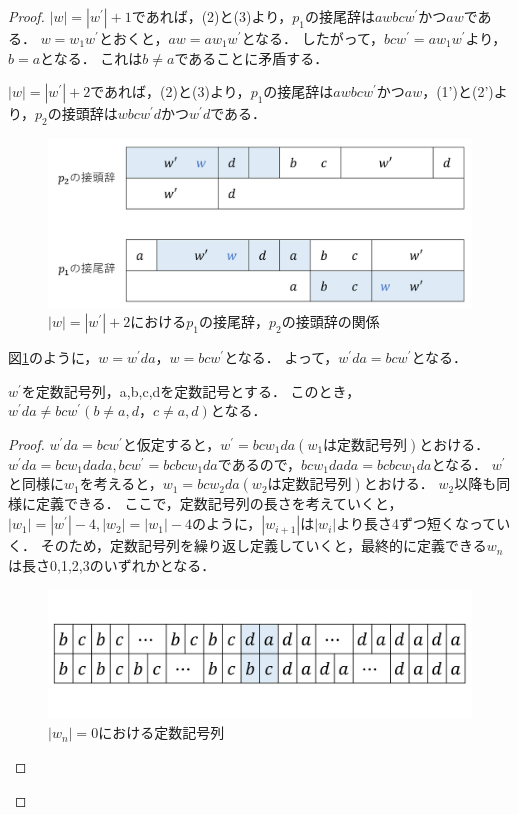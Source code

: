 \begin{proof}
$|w| = |w^{\prime}|+1$であれば，(2)と(3)より，$p_{1}$の接尾辞は$awbcw^{\prime}$かつ$aw$である．
$w=w_{1}w^{\prime}$とおくと，$aw=aw_{1}w^{\prime}$となる．
したがって，$bcw^{\prime}=aw_{1}w^{\prime}$より，$b = a$となる．
これは$b \not = a$であることに矛盾する．

$|w| = |w^{\prime}|+2$であれば，(2)と(3)より，$p_{1}$の接尾辞は$awbcw^{\prime}$かつ$aw$，(1')と(2')より，$p_{2}$の接頭辞は$wbcw^{\prime}d$かつ$w^{\prime}d$である．

\begin{figure}[H]
\includegraphics[width=\linewidth]{画像/追加部分1.png}
\caption{\scriptsize $|w| = |w^{\prime}|+2$における$p_{1}$の接尾辞，$p_{2}$の接頭辞の関係}
\label{追加部分1}
\end{figure}

図\ref{追加部分1}のように，$w=w^{\prime}da，w=bcw^{\prime}$となる．
よって，$w^{\prime}da=bcw^{\prime}$となる．

\begin{cl}\label{主張1}
$w^{\prime}$を定数記号列，a,b,c,dを定数記号とする．
このとき，$w^{\prime}da \not =bcw^{\prime} (b \not = a,d，c \not = a,d)$となる．
\end{cl}
\begin{proof}
$w^{\prime}da=bcw^{\prime}$と仮定すると，$w^{\prime}=bcw_{1}da (w_{1}は定数記号列)$とおける．
$w^{\prime}da=bcw_{1}dada, bcw^{\prime}=bcbcw_{1}da$であるので，$bcw_{1}dada=bcbcw_{1}da$となる．
$w^{\prime}$と同様に$w_{1}$を考えると，$w_{1}=bcw_{2}da (w_{2}は定数記号列)$とおける．
$w_{2}$以降も同様に定義できる．
ここで，定数記号列の長さを考えていくと，$|w_{1}|=|w^{\prime}|-4, |w_{2}|=|w_{1}|-4$のように，$|w_{i+1}|$は$|w_{i}|$より長さ4ずつ短くなっていく．
そのため，定数記号列を繰り返し定義していくと，最終的に定義できる$w_{n}$は長さ0,1,2,3のいずれかとなる．

\begin{figure}[H]
\includegraphics[width=\linewidth]{画像/追加部分2.png}
\caption{$|w_{n}| = 0$における定数記号列}
\label{追加部分2}
\end{figure}


\end{proof}
\end{proof}
